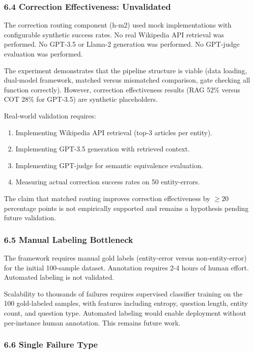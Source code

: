 \subsubsection{6.4 Correction Effectiveness: Unvalidated}

The correction routing component (h-m2) used mock implementations with configurable synthetic success rates. No real Wikipedia API retrieval was performed. No GPT-3.5 or Llama-2 generation was performed. No GPT-judge evaluation was performed.

The experiment demonstrates that the pipeline structure is viable (data loading, dual-model framework, matched versus mismatched comparison, gate checking all function correctly). However, correction effectiveness results (RAG 52\% versus COT 28\% for GPT-3.5) are synthetic placeholders.

Real-world validation requires:

\begin{enumerate}
\item Implementing Wikipedia API retrieval (top-3 articles per entity).
\item Implementing GPT-3.5 generation with retrieved context.
\item Implementing GPT-judge for semantic equivalence evaluation.
\item Measuring actual correction success rates on 50 entity-errors.
\end{enumerate}

The claim that matched routing improves correction effectiveness by $\geq 20$ percentage points is not empirically supported and remains a hypothesis pending future validation.

\subsubsection{6.5 Manual Labeling Bottleneck}

The framework requires manual gold labels (entity-error versus non-entity-error) for the initial 100-sample dataset. Annotation requires 2-4 hours of human effort. Automated labeling is not validated.

Scalability to thousands of failures requires supervised classifier training on the 100 gold-labeled samples, with features including entropy, question length, entity count, and question type. Automated labeling would enable deployment without per-instance human annotation. This remains future work.

\subsubsection{6.6 Single Failure Type}

